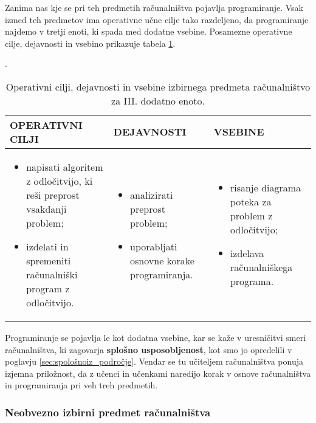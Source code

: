 Zanima nas kje se pri teh predmetih računalništva pojavlja
programiranje. Vsak izmed teh predmetov ima operativne učne cilje tako
razdeljeno, da programiranje najdemo v tretji enoti, ki spada med
dodatne vsebine. Posamezne operativne cilje, dejavnosti in vsebino
prikazuje tabela \ref{tab:cilji_izb_prog}.

\begin{table}[!htb]
  \caption{Operativni cilji, dejavnosti in vsebine izbirnega predmeta
    računalništvo za III. dodatno enoto. \cite{ucni_nacrt-izbirni-os}}.
\label{tab:cilji_izb_prog}
\begin{tabular}{
  | p{} |
  p{} |
  p{} | }
  \hline
  \rowcolor{gray!50}
  \textbf{OPERATIVNI CILJI} & \textbf{DEJAVNOSTI} & \textbf{VSEBINE} \\
  \hline

  \begin{itemize}[leftmargin=*]
    \tightlist
  \item napisati algoritem z odločitvijo, ki reši preprost vsakdanji
    problem;
  \item izdelati in spremeniti računalniški program z odločitvijo.
  \end{itemize}
  &
  \begin{itemize}[leftmargin=*]
  \item analizirati preprost problem;
  \item uporabljati osnovne korake programiranja.
  \end{itemize}
 &
  \begin{itemize}[leftmargin=*]
  \item risanje diagrama poteka za problem z odločitvijo;
  \item izdelava računalniškega programa.
  \end{itemize}
 \\
 \hline
\end{tabular}
\end{table}

Programiranje se pojavlja le kot dodatna vsebine, kar se kaže v
uresničitvi smeri računalništva, ki zagovarja \textbf{splošno
  usposobljenost}, kot smo jo opredelili v poglavju
\ref{sec:spološnoiz_področje}. Vendar se tu učiteljem računalništva
ponuja izjemna priložnost, da z učenci in učenkami naredijo korak v
osnove računalništva in programiranja pri veh treh predmetih.

\subsubsection{Neobvezno izbirni predmet računalništva}
\label{sec:neobvezno_izbirni_predmet_rac}

